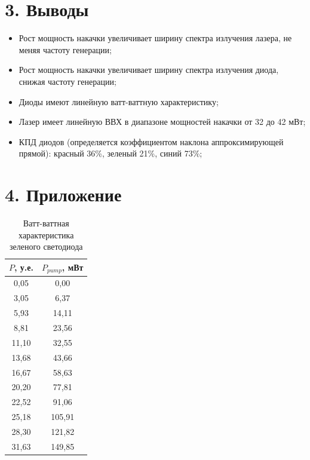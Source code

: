 \documentclass[a4paper,12pt]{report}
\begin{document}
\section*{3. Выводы}
\begin{itemize}
        \item Рост мощность накачки увеличивает ширину спектра излучения лазера, не меняя частоту генерации;
        \item Рост мощность накачки увеличивает ширину спектра излучения диода, снижая частоту генерации;
        \item Диоды имеют линейную ватт-ваттную характеристику;
        \item Лазер имеет линейную ВВХ в диапазоне мощностей накачки от 32 до 42 мВт;
        \item КПД диодов (определяется коэффициентом наклона аппроксимирующей прямой): красный 36\%, зеленый 21\%, синий 73\%;
\end{itemize}

\newpage
\section*{4. Приложение}

\begin{table}[H]
\begin{tabular}{|c|c|}
\hline
$P$, у.е. & $P_{pump}$, мВт \\ \hline
0,05        & 0,00          \\ \hline
3,05        & 6,37     \\ \hline
5,93        & 14,11    \\ \hline
8,81        & 23,56    \\ \hline
11,10        & 32,55    \\ \hline
13,68       & 43,66     \\ \hline
16,67       & 58,63    \\ \hline
20,20        & 77,81      \\ \hline
22,52       & 91,06      \\ \hline
25,18       & 105,91     \\ \hline
28,30        & 121,82    \\ \hline
31,63       & 149,85     \\ \hline
\end{tabular}
\caption{Ватт-ваттная характеристика зеленого светодиода}
\label{tab.2}
\end{table}
\end{document}
